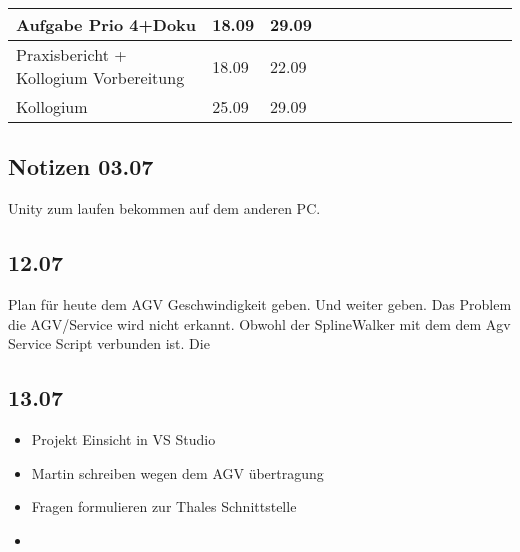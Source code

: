 \begin{landscape}
\begin{tabularx}{21cm}{|l|l|l|X|X|X|X|X|X|X|X|X|X|X|X|}
    Aufgabe Prio 4+Doku                    & 18.09           & 29.09         &                          &                          &                          &                          &                          &                          &                          &                          &                          & \cellcolor[HTML]{68CBD0} & \cellcolor[HTML]{68CBD0} & \cellcolor[HTML]{68CBD0} \\ \hline
    Praxisbericht + Kollogium Vorbereitung & 18.09           & 22.09         &                          &                          &                          &                          &                          &                          &                          &                          &                          &                          & \cellcolor[HTML]{34FF34} &                          \\ \hline
    Kollogium                              & 25.09           & 29.09         &                          &                          &                          &                          &                          &                          &                          &                          &                          &                          &                          & \cellcolor[HTML]{FE0000} \\ \hline
\end{tabularx}
\end{landscape}
   

\subsection{Notizen 03.07}
Unity zum laufen bekommen auf dem anderen PC.

\subsection{12.07}
Plan für heute dem AGV Geschwindigkeit geben. Und weiter geben. Das Problem die AGV/Service wird nicht erkannt. Obwohl der SplineWalker mit dem dem Agv Service Script verbunden ist. Die 

\subsection{13.07}
\begin{itemize}
\item Projekt Einsicht in VS Studio
\item Martin schreiben wegen dem AGV übertragung
\item Fragen formulieren zur Thales Schnittstelle
\item 
\end{itemize}

